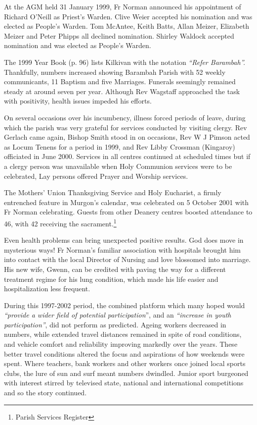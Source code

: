 At the AGM held 31 January 1999, Fr Norman announced his appointment of Richard O'Neill as Priest's Warden. Clive Weier accepted his nomination and was elected as People's Warden. Tom McAntee, Keith Batts, Allan Meizer, Elizabeth Meizer and Peter Phipps all declined nomination. Shirley Waldock accepted nomination and was elected as People's Warden.



The 1999 Year Book (p. 96) lists Kilkivan with the notation \emph{``Refer Barambah''.} Thankfully, numbers increased showing Barambah Parish with 52 weekly communicants, 11 Baptism and five Marriages. Funerals seemingly remained steady at around seven per year. Although Rev Wagstaff approached the task with positivity, health issues impeded his efforts.



On several occasions over his incumbency, illness forced periods of leave, during which the parish was very grateful for services conducted by visiting clergy. Rev Gerlach came again, Bishop Smith stood in on occasions, Rev W J Pimson acted as Locum Tenens for a period in 1999, and Rev Libby Crossman (Kingaroy) officiated in June 2000. Services in all centres continued at scheduled times but if a clergy person was unavailable when Holy Communion services were to be celebrated, Lay persons offered Prayer and Worship services.



The Mothers' Union Thanksgiving Service and Holy Eucharist, a firmly entrenched feature in Murgon's calendar, was celebrated on 5 October 2001 with Fr Norman celebrating. Guests from other Deanery centres boosted attendance to 46, with 42 receiving the sacrament.\footnote{Parish Services Register}


Even health problems can bring unexpected positive results. God does move in mysterious ways! Fr Norman's familiar association with hospitals brought him into contact with the local Director of Nursing and love blossomed into marriage. His new wife, Gwenn, can be credited with paving the way for a different treatment regime for his lung condition, which made his life easier and hospitalization less frequent.



During this 1997-2002 period, the combined platform which many hoped would \emph{``provide a wider field of potential participation}'', and an \emph{``increase in youth participation''}, did not perform as predicted. Ageing workers decreased in numbers, while extended travel distances remained in spite of road conditions, and vehicle comfort and reliability improving markedly over the years. These better travel conditions altered the focus and aspirations of how weekends were spent. Where teachers, bank workers and other workers once joined local sports clubs, the lure of sun and surf meant numbers dwindled. Junior sport burgeoned with interest stirred by televised state, national and international competitions and so the story continued.



